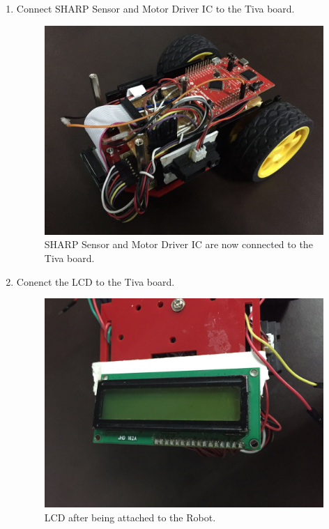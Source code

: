\documentclass[a4paper,12pt,oneside]{book}
\begin{document}
\begin{enumerate}
\item Connect SHARP Sensor and Motor Driver IC to the Tiva board.
\begin{figure}[h]
        \centering
        \includegraphics[scale=0.16]{all_connected}
        \caption{SHARP Sensor and Motor Driver IC are now connected to the Tiva board.}
      \end{figure}
      \newpage

\item Conenct the LCD to the Tiva board.
\begin{figure}[h]
        \centering
        \includegraphics[scale=0.16]{lcd_a}
        \caption{LCD after being attached to the Robot.}
      \end{figure}


\end{enumerate}
\end{document}
